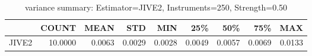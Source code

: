 \begin{table}[ht]
\centering
\caption{variance summary: Estimator=JIVE2, Instruments=250, Strength=0.50}
\begin{tabular}{lrrrrrrrr}
\toprule
 & COUNT & MEAN & STD & MIN & 25\% & 50\% & 75\% & MAX \\
\midrule
JIVE2 & 10.0000 & 0.0063 & 0.0029 & 0.0028 & 0.0049 & 0.0057 & 0.0069 & 0.0133 \\
\bottomrule
\end{tabular}
\end{table}
